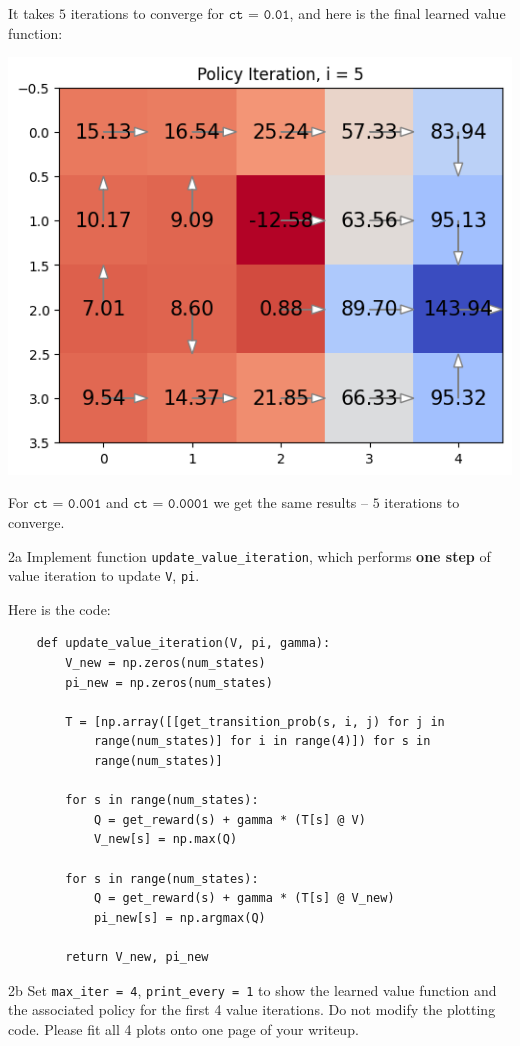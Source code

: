 \documentclass[expanded]{lkx_pset}
\begin{document}
\begin{solution}
	It takes $5$ iterations to converge for $\texttt{ct = 0.01}$, and here is the final learned value function:
	\begin{center}
		\includegraphics[scale=0.5]{figures/1d.png}
	\end{center}
	For $\texttt{ct = 0.001}$ and $\texttt{ct = 0.0001}$ we get the same results -- $5$ iterations to converge.

	\begin{part}{2a} Implement function
		\texttt{update\_value\_iteration}, which performs \textbf{one step} of value iteration to update \texttt{V}, \texttt{pi}.
	\end{part}

	Here is the code:
	\begin{verbatim}
	def update_value_iteration(V, pi, gamma):
    	V_new = np.zeros(num_states)
    	pi_new = np.zeros(num_states)
    	
    	T = [np.array([[get_transition_prob(s, i, j) for j in
        	range(num_states)] for i in range(4)]) for s in
        	range(num_states)]

    	for s in range(num_states):
        	Q = get_reward(s) + gamma * (T[s] @ V)
        	V_new[s] = np.max(Q)

    	for s in range(num_states):
        	Q = get_reward(s) + gamma * (T[s] @ V_new)
        	pi_new[s] = np.argmax(Q)

    	return V_new, pi_new
	\end{verbatim}

	\begin{part}{2b} Set \texttt{max\_iter = 4}, \texttt{print\_every = 1} to show the learned value function and the associated policy for the first 4 value iterations. Do not modify the plotting code. Please fit all 4 plots onto one page of your writeup.
	\end{part}


\end{solution}
\end{document}
